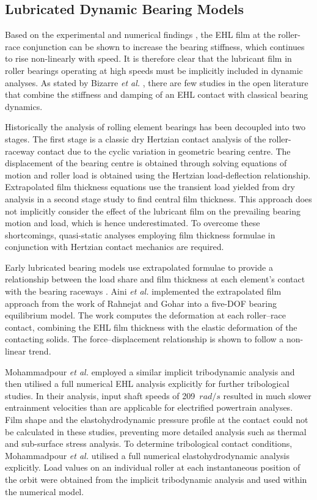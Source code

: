 \subsection{Lubricated Dynamic Bearing Models}

Based on the experimental and numerical findings \cite{Questa2020} \cite{Stone1982} \cite{Dietl1997}, the EHL film at the roller-race conjunction can be shown to increase the bearing stiffness, which continues to rise non-linearly with speed. It is therefore clear that the lubricant film in roller bearings operating at high speeds must be implicitly included in dynamic analyses. As stated by Bizarre \textit{et al.} \cite{Bizarre2018}, there are few studies in the open literature that combine the stiffness and damping of an EHL contact with classical bearing dynamics.

Historically the analysis of rolling element bearings has been decoupled into two stages. The first stage is a classic dry Hertzian contact analysis of the roller-raceway contact due to the cyclic variation in geometric bearing centre.  The displacement of the bearing centre is obtained through solving equations of motion and roller load is obtained using the Hertzian load-deflection relationship. Extrapolated film thickness equations use the transient load yielded from dry analysis in a second stage study to find central film thickness. This approach does not implicitly consider the effect of the lubricant film on the prevailing bearing motion and load, which is hence underestimated. To overcome these shortcomings, quasi-static analyses employing film thickness formulae in conjunction with Hertzian contact mechanics are required.

Early lubricated bearing models use extrapolated formulae to provide a relationship between the load share and film thickness at each element’s contact with the bearing raceways \cite{Rahnejat1985}. Aini \textit{et al.} \cite{Aini2002} implemented the extrapolated film approach from the work of Rahnejat and Gohar \cite{Rahnejat1985} into a five-DOF bearing equilibrium model. The work computes the deformation at each roller–race contact, combining the EHL film thickness with the elastic deformation of the contacting solids. The force–displacement relationship is shown to follow a non-linear trend.

Mohammadpour \textit{et al.} \cite{Mohammadpour2015c} employed a similar implicit tribodynamic analysis and then utilised a full numerical EHL analysis explicitly for further tribological studies. In their analysis, input shaft speeds of 209~$rad/s$ resulted in much slower entrainment velocities than are applicable for electrified powertrain analyses. Film shape and the elastohydrodynamic pressure profile at the contact could not be calculated in these studies, preventing more detailed analysis such as thermal and sub-surface stress analysis. To determine tribological contact conditions, Mohammadpour \textit{et al.} \cite{Mohammadpour2015c} utilised a full numerical elastohydrodynamic analysis explicitly. Load values on an individual roller at each instantaneous position of the orbit were obtained from the implicit tribodynamic analysis and used within the numerical model.

